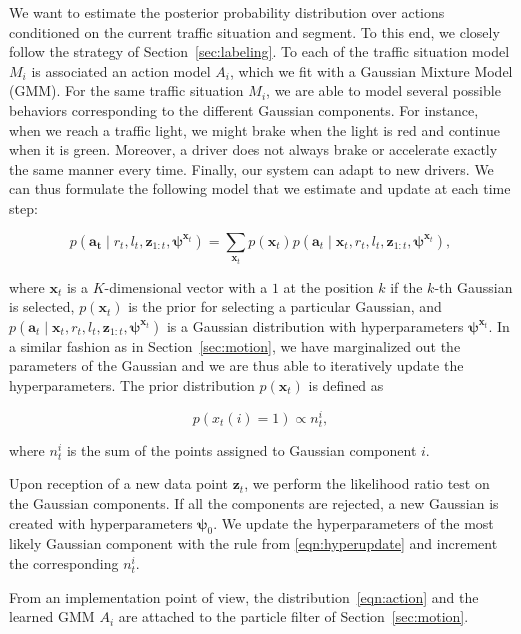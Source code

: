 We want to estimate the posterior probability distribution over actions
conditioned on the current traffic situation and segment. To this end, we
closely follow the strategy of Section~\ref{sec:labeling}. To each of the
traffic situation model $M_i$ is associated an action model $A_i$, which we fit
with a Gaussian Mixture Model (GMM). For the same traffic situation $M_i$, we
are able to model several possible behaviors corresponding to the different
Gaussian components. For instance, when we reach a traffic light, we might brake
when the light is red and continue when it is green. Moreover, a driver does not
always brake or accelerate exactly the same manner every time. Finally, our
system can adapt to new drivers. We can thus formulate the following model that
we estimate and update at each time step:

\begin{equation}
\label{eqn:action}
p(\mathbf{a_t} \mid r_t, l_t,\mathbf{z}_{1:t},\boldsymbol{\psi}^{\mathbf{x}_t})=
\sum_{\mathbf{x}_t} p(\mathbf{x}_t)p(\mathbf{a}_t\mid\mathbf{x}_t,r_t,l_t,
\mathbf{z}_{1:t},\boldsymbol{\psi}^{\mathbf{x}_t}),
\end{equation}

where $\mathbf{x}_t$ is a $K$-dimensional vector with a $1$ at the position $k$
if the $k$-th Gaussian is selected, $p(\mathbf{x}_t)$ is the prior for selecting
a particular Gaussian, and $p(\mathbf{a}_t\mid\mathbf{x}_t,r_t,l_t,
\mathbf{z}_{1:t},\boldsymbol{\psi}^{\mathbf{x}_t})$ is a Gaussian distribution
with hyperparameters $\boldsymbol{\psi}^{\mathbf{x}_t}$. In a similar fashion as
in Section~\ref{sec:motion}, we have marginalized out the parameters of the
Gaussian and we are thus able to iteratively update the hyperparameters. The
prior distribution $p(\mathbf{x}_t)$ is defined as

\begin{equation}
\label{eqn:gaussianprior}
p(x_t(i)=1)\propto n_t^i,
\end{equation}

where $n_t^i$ is the sum of the points assigned to Gaussian component $i$.

Upon reception of a new data point $\mathbf{z}_t$, we perform the likelihood
ratio test on the Gaussian components. If all the components are rejected, a new
Gaussian is created with hyperparameters $\boldsymbol{\psi}_0$. We update the
hyperparameters of the most likely Gaussian component with the rule from
\eqref{eqn:hyperupdate} and increment the corresponding $n_t^i$.

From an implementation point of view, the distribution~\eqref{eqn:action} and
the learned GMM $A_i$ are attached to the particle filter of
Section~\ref{sec:motion}.
